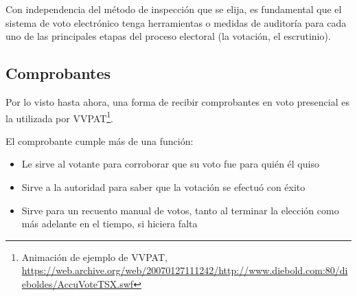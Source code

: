 \documentclass[a4,11pt]{article}
\begin{document}
Con independencia del método de inspección que se elija, es fundamental que el sistema de voto electrónico tenga herramientas o medidas de auditoría para cada uno de las principales etapas del proceso electoral (la votación, el escrutinio).

\subsection{Comprobantes}

Por lo visto hasta ahora, una forma de recibir comprobantes en voto presencial es la utilizada por VVPAT\footnote{Animación de ejemplo de VVPAT, \url{https://web.archive.org/web/20070127111242/http://www.diebold.com:80/dieboldes/AccuVoteTSX.swf}}.

El comprobante cumple más de una función:
\begin{itemize}
\item Le sirve al votante para corroborar que su voto fue para quién él quiso
\item Sirve a la autoridad para saber que la votación se efectuó con éxito
\item Sirve para un recuento manual de votos, tanto al terminar la elección como más adelante en el tiempo, si hiciera falta
\end{itemize}


\end{document}
